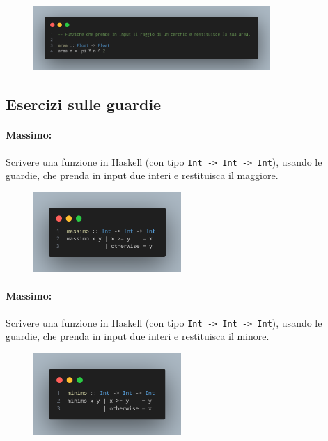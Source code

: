 \begin{figure}[!h]
    \centering
    \includegraphics[width=0.8\textwidth]{images/Area.png}
\end{figure}
\pagebreak
\subsection{Esercizi sulle guardie}

\paragraph{Massimo:} Scrivere una funzione in Haskell (con tipo \texttt{Int -> Int -> Int}), usando 
le guardie, che
prenda in input due interi e restituisca il maggiore.

\begin{figure}[!h]
    \centering
    \includegraphics[width=0.5\textwidth]{images/Massimo.png}
\end{figure}

\paragraph{Massimo:} Scrivere una funzione in Haskell (con tipo \texttt{Int -> Int -> Int}), usando 
le guardie, che
prenda in input due interi e restituisca il minore.

\begin{figure}[!h]
    \centering
    \includegraphics[width=0.5\textwidth]{images/Minimo.png}
\end{figure}


